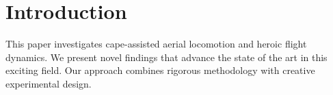 \section{Introduction}

This paper investigates cape-assisted aerial locomotion and heroic flight dynamics. We present novel findings that advance the state of the art in this exciting field. Our approach combines rigorous methodology with creative experimental design.
